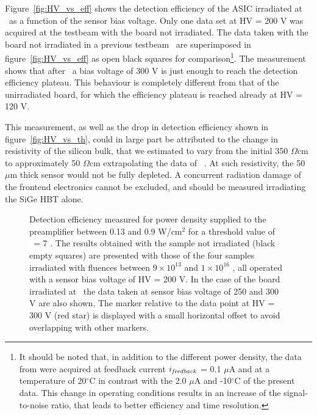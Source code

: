 		Figure~\ref{fig:HV_vs_eff}  shows the detection efficiency of the ASIC irradiated at \maxflu~as a function of the sensor bias voltage. 
		Only one data set at HV = 200 V was acquired at the testbeam with the board not irradiated. The data taken with the board not irradiated in a previous testbeam~\cite{Zambito_2023} are superimposed in figure~\ref{fig:HV_vs_eff} as open black squares for comparison\footnote{It should be noted that, in addition to the different power density, the data from \cite{Zambito_2023} were acquired at feedback current $i_{\it feedback}$ = 0.1 $\mu$A and at a temperature of 20$^\circ$C in contrast with the 2.0 $\mu$A and -10$^\circ$C of the present data. This change in operating conditions results in an increase of the signal-to-noise ratio, that leads to better efficiency and time resolution.}.
		The measurement shows that after \maxflu~a bias voltage of 300 V is just enough to reach the detection efficiency plateau. This behaviour is completely different from that of the unirradiated board, for which the efficiency plateau is reached already at HV = 120 V.

		This measurement, as well as the drop in detection efficiency shown in figure~\ref{fig:HV_vs_th}, could in large part be attributed to the change in resistivity of the silicon bulk, that we estimated to vary from the initial 350 $\Omega$cm to approximately 50 $\Omega$cm extrapolating the data of ~\cite{RadiationDamageBruzzi, DisplacementDamageMoll}.
		At such resistivity, the 50 $\mu$m thick sensor would not be fully depleted.
		A concurrent radiation damage of the frontend electronics cannot be excluded, and should be measured irradiating the SiGe HBT alone.


		\begin{figure}[!htb]
			\centering
			\caption{\label{fig:Power_vs_eff}Detection efficiency measured for power density supplied to the preamplifier   between 0.13 and 0.9 W/cm$^2$ for a threshold value of \vth~= 7 \sigmav. The results obtained with the sample  not irradiated  (black empty squares) are presented with those of the four samples irradiated  with fluences between $9 \times 10^{13}$ \flu  and $1 \times 10^{16}$ \flu, all operated with a sensor bias voltage of HV = 200 V. In the case of the board irradiated at \maxflu~the data taken  at sensor bias voltage of 250 and 300 V are also shown. The marker relative to the data point at HV = 300 V (red star) is displayed with a small horizontal offset to avoid  overlapping with other markers.}
		\end{figure}

